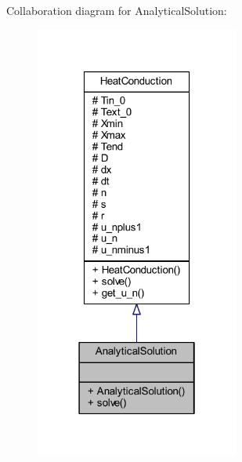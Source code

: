 Collaboration diagram for Analytical\+Solution\+:
\nopagebreak
\begin{figure}[H]
\begin{center}
\leavevmode
\includegraphics[width=190pt]{class_analytical_solution__coll__graph}
\end{center}
\end{figure}
